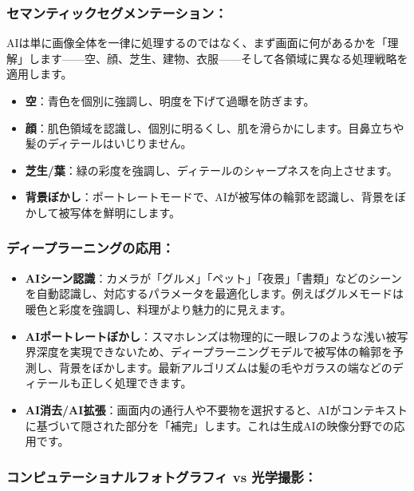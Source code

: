 \subsubsection*{セマンティックセグメンテーション：}

AIは単に画像全体を一律に処理するのではなく、まず画面に何があるかを「理解」します——空、顔、芝生、建物、衣服——そして各領域に異なる処理戦略を適用します。

\begin{itemize}
  \item \textbf{空}：青色を個別に強調し、明度を下げて過曝を防ぎます。
  \item \textbf{顔}：肌色領域を認識し、個別に明るくし、肌を滑らかにします。目鼻立ちや髪のディテールはいじりません。
  \item \textbf{芝生/葉}：緑の彩度を強調し、ディテールのシャープネスを向上させます。
  \item \textbf{背景ぼかし}：ポートレートモードで、AIが被写体の輪郭を認識し、背景をぼかして被写体を鮮明にします。
\end{itemize}

\subsubsection*{ディープラーニングの応用：}

\begin{itemize}
  \item \textbf{AIシーン認識}：カメラが「グルメ」「ペット」「夜景」「書類」などのシーンを自動認識し、対応するパラメータを最適化します。例えばグルメモードは暖色と彩度を強調し、料理がより魅力的に見えます。
  \item \textbf{AIポートレートぼかし}：スマホレンズは物理的に一眼レフのような浅い被写界深度を実現できないため、ディープラーニングモデルで被写体の輪郭を予測し、背景をぼかします。最新アルゴリズムは髪の毛やガラスの端などのディテールも正しく処理できます。
  \item \textbf{AI消去/AI拡張}：画面内の通行人や不要物を選択すると、AIがコンテキストに基づいて隠された部分を「補完」します。これは生成AIの映像分野での応用です。
\end{itemize}

\subsubsection*{コンピュテーショナルフォトグラフィ vs 光学撮影：}

